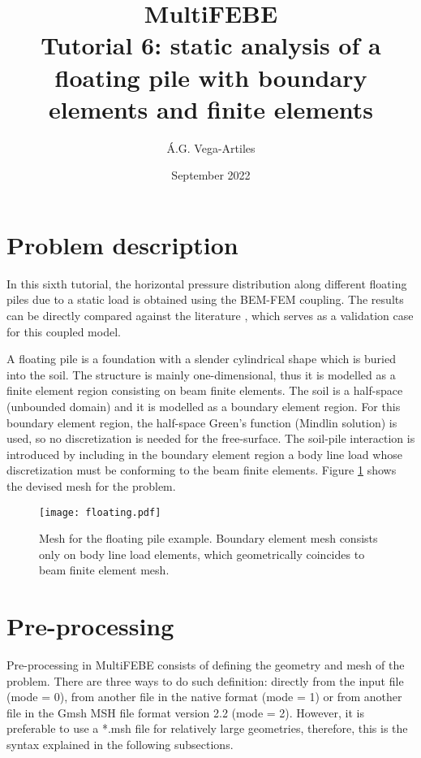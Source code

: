 \documentclass[a4]{article}
\title{MultiFEBE \\ Tutorial 6: static analysis of a floating pile with boundary elements and finite elements}
\author{\'A.G. Vega-Artiles}
\date{September 2022}
\begin{document}
\maketitle

\tableofcontents 

\section{Problem description}

In this sixth tutorial, the horizontal pressure distribution along different floating piles due to a static load is obtained using the BEM-FEM coupling. The results can be directly compared against the literature \cite{poulos}, which serves as a validation case for this coupled model.

A floating pile is a foundation with a slender cylindrical shape which is buried into the soil. The structure is mainly one-dimensional, thus it is modelled as a finite element region consisting on beam finite elements. The soil is a half-space (unbounded domain) and it is modelled as a boundary element region. For this boundary element region, the half-space Green's function (Mindlin solution) is used, so no discretization is needed for the free-surface. The soil-pile interaction is introduced by including in the boundary element region a body line load whose discretization must be conforming to the beam finite elements. Figure \ref{fig:layout} shows the devised mesh for the problem.

\begin{figure}[tbh!]
	\centering
	\texttt{[image: floating.pdf]}
	\caption{Mesh for the floating pile example. Boundary element mesh consists only on body line load elements, which geometrically coincides to beam finite element mesh.}
	\label{fig:layout}
\end{figure}

\section{Pre-processing} 
Pre-processing in MultiFEBE consists of defining the geometry and mesh of the problem. There are three ways to do such definition: directly from the input file (mode = 0), from another file in the native format (mode = 1) or from another file in the Gmsh MSH file format version 2.2 (mode = 2). However, it is preferable to use a *.msh file for relatively large geometries, therefore, this is the syntax explained in the following subsections.
   
\end{document}
